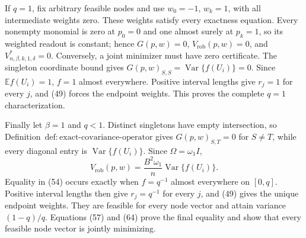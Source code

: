If \(q=1\), fix arbitrary feasible nodes and use \(w_0=-1\), \(w_k=1\), with all intermediate weights zero.  These weights satisfy every exactness equation.  Every nonempty monomial is zero at \(p_0=0\) and one almost surely at \(p_k=1\), so its weighted readout is constant; hence \(G(p,w)=0\), \(V_{\mathrm{rob}}(p,w)=0\), and \(V^*_{n,\beta,k,1,\delta}=0\).  Conversely, a joint minimizer must have zero certificate.  The singleton coordinate bound gives \(G(p,w)_{S,S}=\operatorname{Var}\{f(U_i)\}=0\).  Since \(\mathbb Ef(U_i)=1\), \(f=1\) almost everywhere.  Positive interval lengths give \(r_j=1\) for every \(j\), and (49) forces the endpoint weights.  This proves the complete \(q=1\) characterization.

Finally let \(\beta=1\) and \(q<1\).  Distinct singletons have empty intersection, so Definition~\(\mathrm{def{:}exact\text{-}covariance\text{-}operator}\) gives \(G(p,w)_{S,T}=0\) for \(S\ne T\), while every diagonal entry is \(\operatorname{Var}\{f(U_i)\}\).  Since \(\Omega=\omega_1I\),
\[
V_{\mathrm{rob}}(p,w)
=\frac{B^2\omega_1}{n}\operatorname{Var}\{f(U_i)\}.
\tag{64}
\]
Equality in (54) occurs exactly when \(f=q^{-1}\) almost everywhere on \([0,q]\).  Positive interval lengths then give \(r_j=q^{-1}\) for every \(j\), and (49) gives the unique endpoint weights.  They are feasible for every node vector and attain variance \((1-q)/q\).  Equations (57) and (64) prove the final equality and show that every feasible node vector is jointly minimizing.